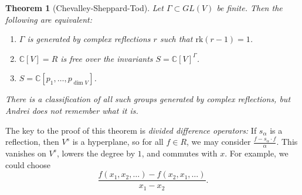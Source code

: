 \documentclass[leqno, openany]{memoir}
\newtheorem{thm}{Theorem}[section]
\theoremstyle{definition}
\theoremstyle{remark}
\theoremstyle{plain}
\theoremstyle{definition}
\theoremstyle{remark}
\newcommand{\C}{\mathbb{C}}
\newcommand{\mr}[1]{\mathrm{#1}}
\begin{document}
\begin{thm}[Chevalley-Sheppard-Tod]
    Let $\Gamma \subset GL(V)$ be finite. Then the following are equivalent:
    \begin{enumerate}
        \item $\Gamma$ is generated by complex reflections $r$ such that $\mr{rk}(r-1) = 1$.
        \item $\C[V] = R$ is free over the invariants $S = {\C[V]}^{\Gamma}$.
        \item $S = \C[p_1, \ldots, p_{\dim V}]$.
    \end{enumerate}
    There is a classification of all such groups generated by complex reflections, but Andrei does not remember what it is.
\end{thm}

The key to the proof of this theorem is \textit{divided difference operators:} If $s_{\alpha}$ is a reflection, then $V^s$ is a hyperplane, so for all $f \in R$, we may consider $\frac{ f - s_{\alpha} \cdot f }{\alpha}$. This vanishes on $V^s$, lowers the degree by $1$, and commutes with $x$. For example, we could choose
\[ \frac{f(x_1, x_2, \ldots) - f(x_2, x_1, \ldots)}{x_1 - x_2}. \]
\end{document}
